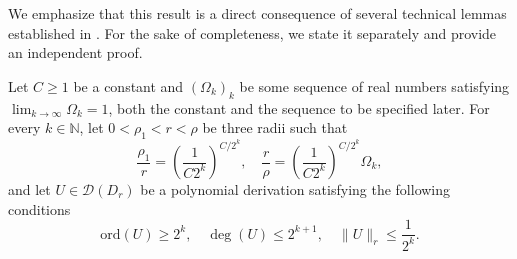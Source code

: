 \documentclass[10pt,twoside,reqno]{amsart}
\theoremstyle{remark}
\theoremstyle{remark}
\newcommand{\ord}{\mathrm{ord}}
\newcommand{\cD}{\mathcal{D}}
\begin{document}
We emphasize that this result is a direct consequence of several technical lemmas established in \cite{Bruno1971_1972}. For the sake of completeness, we state it separately and provide an independent proof.


Let $C\geq 1$ be a constant and $(\Omega_k)_k$ be some sequence of real numbers satisfying $\lim_{k \rightarrow \infty} \Omega_k = 1$, both the constant and the sequence to be specified later. For every $k\in \mathbb N$, let $0
< \rho_1 < r < \rho$ be three radii such that 
\begin{equation} \label{radius-assumptions}
	\frac{\rho_1}{r} = \left( \frac{1}{C 2^k} \right)^{C / 2^k}, \quad
	\frac{r}{\rho} = \left( \frac{1}{C 2^k} \right)^{C / 2^k} \Omega_k ,
\end{equation}
and let $U\in \cD(D_r)$ be a polynomial derivation satisfying the following conditions
\[ \ord (U) \geq 2^k, \quad \deg (U) \leq 2^{k + 1}, \quad \| U \|_r
\leq \frac{1}{2^k}. \]
\end{document}
